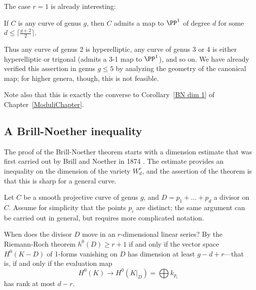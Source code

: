 The case $r=1$ is already interesting:

\begin{corollary}
If $C$ is any curve of genus $g$, then $C$ admits a map  to $\PP^1$ of degree $d$ for some $d \leq \lceil \frac{g+2}{2}\rceil$.
\end{corollary}

Thus any curve of genus 2 is hyperelliptic, any curve of genus 3 or 4 is either hyperelliptic or trigonal  (admits a 3-1 map to $\PP^1$), and so on. We have already verified this assertion in genus $g \leq 5$ by analyzing the geometry of the canonical map; for higher genera, though, this is not feasible.

Note also that this is exactly the converse to Corollary~\ref{BN dim 1} of Chapter~\ref{ModuliChapter}.


\subsection{A Brill-Noether inequality}\label{BN by divisors}

The proof of the Brill-Noether theorem starts with a dimension estimate that was first carried out by Brill and Noether in 1874 \cite{Brill-NoetherOriginal}. The estimate provides an inequality on the dimension
of the variety $W^r_d$, and the assertion of the theorem is that this is sharp for a general curve.


Let $C$ be a smooth projective curve of genus $g$, and $D = p_1 + \dots + p_d$ a divisor on $C$. Assume for simplicity that  the points $p_i$ are distinct; the same argument  can be carried out in general, but requires more complicated notation.

When does the divisor $D$ move in an $r$-dimensional linear series? By the Riemann-Roch theorem $h^0(D) \geq r+1$ if and only if the vector space $H^0(K-D)$ of 1-forms vanishing on $D$ has dimension at least $g-d+r$---that is, if and only if the  evaluation map
$$
H^0(K) \to H^0(K|_D) = \bigoplus k_{p_i}
$$
has rank at most $d-r$. 


